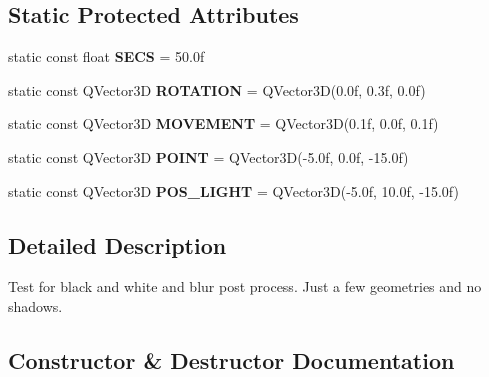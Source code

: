 \subsection*{Static Protected Attributes}
\begin{DoxyCompactItemize}
\item 
\mbox{\label{class_unit_test_1_1_c_post_process_test_acff8e621a7a04200d6712abfe11da94e}} 
static const float {\bfseries S\+E\+CS} = 50.\+0f
\item 
\mbox{\label{class_unit_test_1_1_c_post_process_test_aa0d78cc64f6a21d231703f6c299f62ea}} 
static const Q\+Vector3D {\bfseries R\+O\+T\+A\+T\+I\+ON} = Q\+Vector3D(0.\+0f, 0.\+3f, 0.\+0f)
\item 
\mbox{\label{class_unit_test_1_1_c_post_process_test_ab46e953eea257dea451351b8d44297de}} 
static const Q\+Vector3D {\bfseries M\+O\+V\+E\+M\+E\+NT} = Q\+Vector3D(0.\+1f, 0.\+0f, 0.\+1f)
\item 
\mbox{\label{class_unit_test_1_1_c_post_process_test_a157ce0026e7773bf2654071cb4280b95}} 
static const Q\+Vector3D {\bfseries P\+O\+I\+NT} = Q\+Vector3D(-\/5.\+0f, 0.\+0f, -\/15.\+0f)
\item 
\mbox{\label{class_unit_test_1_1_c_post_process_test_a1485a88f65e1ee211f98ab867dd33721}} 
static const Q\+Vector3D {\bfseries P\+O\+S\+\_\+\+L\+I\+G\+HT} = Q\+Vector3D(-\/5.\+0f, 10.\+0f, -\/15.\+0f)
\end{DoxyCompactItemize}


\subsection{Detailed Description}
Test for black and white and blur post process. Just a few geometries and no shadows. 

\subsection{Constructor \& Destructor Documentation}
\mbox{\label{class_unit_test_1_1_c_post_process_test_ab432ec90a2fe56772f244e0640d55c37}} 

